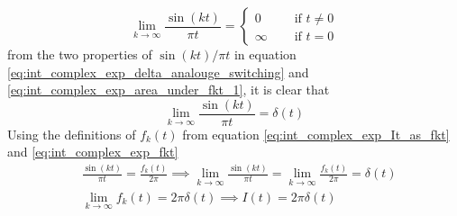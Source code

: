 \documentclass[11pt, a4paper]{article}
\begin{document}
	\begin{equation}\label{eq:int_complex_exp_delta_analouge_switching}
		\lim \limits_{k \to \infty} \frac{\sin(kt)}{\pi t} = \left\{
		\begin{array}{ll}
			0  &  \quad \text{ if } t \neq 0 \\
			\infty & \quad \text{ if } t = 0
		\end{array}
		\right.
	\end{equation}
	from the two properties of $\sin(kt)/\pi t$ in equation \eqref{eq:int_complex_exp_delta_analouge_switching} and \eqref{eq:int_complex_exp_area_under_fkt_1}, it is clear that
	\begin{equation*}
		\lim \limits_{k \to \infty} \frac{\sin(kt)}{\pi t} = \delta(t)
	\end{equation*}
	Using the definitions of $f_{k}(t)$ from equation \eqref{eq:int_complex_exp_It_as_fkt} and \eqref{eq:int_complex_exp_fkt}
	\begin{align*}
		& \frac{\sin(kt)}{\pi t} = \frac{f_{k}(t)}{2\pi} \implies \lim \limits_{k \to \infty} \frac{\sin(kt)}{\pi t} = \lim \limits_{k \to \infty} \frac{f_{k}(t)}{2\pi} = \delta(t) \\
		& \lim \limits_{k \to \infty} f_{k}(t) = 2 \pi \delta(t) \implies \boxed{I(t) = 2 \pi \delta(t)}
	\end{align*}
	
	
	
\end{document}

